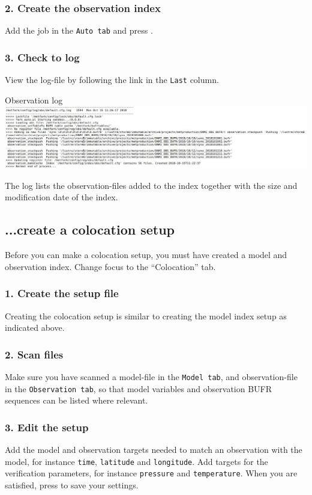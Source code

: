 \documentclass[letterpaper,10pt,twoside,twocolumn,openany]{book}
\begin{document}
{\subsubsection{2. Create the observation index}
Add the job in the \lstinline!Auto tab! and
press . 

\subsubsection{3. Check to log}
View the log-file by following the link in the \lstinline!Last! column. 
\begin{paperbox}{Observation log}
  \includegraphics[width=\columnwidth]{obslog.jpg}
\end{paperbox}
The log lists the observation-files added to the index together with the 
size and modification date of the index.

\subsection{...create a colocation setup}
Before you can make a colocation setup, you must have
created a model and observation index. 
Change focus to the ``Colocation'' tab. 

\subsubsection{1. Create the setup file}
Creating the colocation setup is similar to creating the model index setup as indicated above.

\subsubsection{2. Scan files}
Make sure you have scanned a model-file in the \lstinline!Model tab!,
and observation-file in the \lstinline!Observation tab!,
so that model variables and observation BUFR sequences can be listed where relevant.

\subsubsection{3. Edit the setup}
Add the model and observation targets needed to match an observation with the model, for instance
\lstinline!time!, \lstinline!latitude! and \lstinline!longitude!.
Add targets for the verification parameters, for instance \lstinline!pressure! and \lstinline!temperature!. 
When you are satisfied, press  to save your settings.

}
\end{document}
